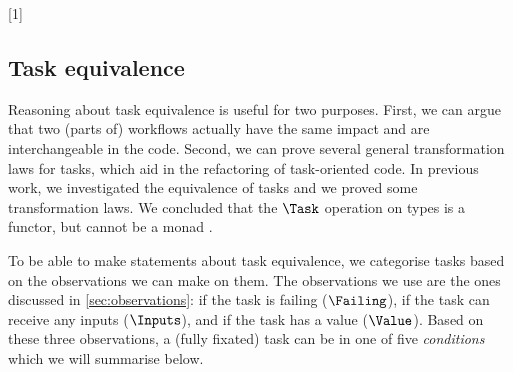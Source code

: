 [1]{} %

\subsection{Task equivalence}
\label{sec:equivalence}

Reasoning about task equivalence is useful for two purposes.
First, we can argue that two (parts of) workflows
actually have the same impact and are interchangeable in the code.
Second, we can prove several general transformation laws for tasks,
which aid in the refactoring of task-oriented code.
%
In previous work, we investigated the equivalence of tasks
and we proved some transformation laws.
We concluded that the $\Task$ operation on types is a functor,
but cannot be a monad \cite{conf/sfp/KlijnsmaS22}.

To be able to make statements about task equivalence,
we categorise tasks based on the observations we can make on them.
The observations we use are the ones discussed in \cref{sec:observations}:
if the task is failing ($\Failing$),
if the task can receive any inputs ($\Inputs$),
and if the task has a value ($\Value$).
Based on these three observations,
a (fully fixated) task can be in one of five \emph{conditions} which we will summarise below.

